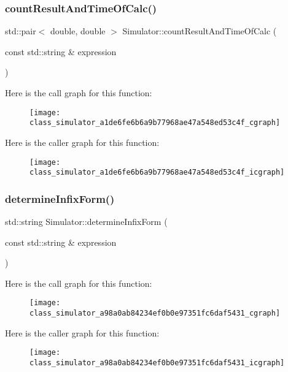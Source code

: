 \subsubsection{\texorpdfstring{countResultAndTimeOfCalc()}{countResultAndTimeOfCalc()}}
{\footnotesize\ttfamily std\+::pair$<$ double, double $>$ Simulator\+::count\+Result\+And\+Time\+Of\+Calc (\begin{DoxyParamCaption}\item[{const std\+::string \&}]{expression }\end{DoxyParamCaption})}

Here is the call graph for this function\+:
\nopagebreak
\begin{figure}[H]
\begin{center}
\leavevmode
\texttt{[image: class\_simulator\_a1de6fe6b6a9b77968ae47a548ed53c4f\_cgraph]}
\end{center}
\end{figure}
Here is the caller graph for this function\+:
\nopagebreak
\begin{figure}[H]
\begin{center}
\leavevmode
\texttt{[image: class\_simulator\_a1de6fe6b6a9b77968ae47a548ed53c4f\_icgraph]}
\end{center}
\end{figure}
\mbox{\label{class_simulator_a98a0ab84234ef0b0e97351fc6daf5431}} 
\subsubsection{\texorpdfstring{determineInfixForm()}{determineInfixForm()}}
{\footnotesize\ttfamily std\+::string Simulator\+::determine\+Infix\+Form (\begin{DoxyParamCaption}\item[{const std\+::string \&}]{expression }\end{DoxyParamCaption})}

Here is the call graph for this function\+:
\nopagebreak
\begin{figure}[H]
\begin{center}
\leavevmode
\texttt{[image: class\_simulator\_a98a0ab84234ef0b0e97351fc6daf5431\_cgraph]}
\end{center}
\end{figure}
Here is the caller graph for this function\+:
\nopagebreak
\begin{figure}[H]
\begin{center}
\leavevmode
\texttt{[image: class\_simulator\_a98a0ab84234ef0b0e97351fc6daf5431\_icgraph]}
\end{center}
\end{figure}
\mbox{\label{class_simulator_adfe488254b0356fa6e1bd3965519b73e}} 
